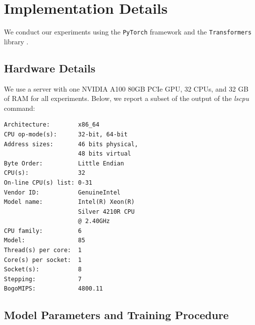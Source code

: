
\section{Implementation Details}\label{app:15-implementation_details}

We conduct our experiments using the \texttt{PyTorch} framework \citep{paszke-etal-2019-pytorch} and the \texttt{Transformers} library \citep{wolf-etal-2020-transformers}.

\subsection{Hardware Details}

We use a server with one NVIDIA A100 80GB PCIe GPU, 32 CPUs, and 32 GB of RAM for all experiments. Below, we report a subset of the output of the \emph{lscpu} command:

\begin{tcolorbox}[left=5pt,right=5pt,top=5pt,bottom=5pt]
\small
\begin{verbatim}
Architecture:        x86_64
CPU op-mode(s):      32-bit, 64-bit
Address sizes:       46 bits physical, 
                     48 bits virtual
Byte Order:          Little Endian
CPU(s):              32
On-line CPU(s) list: 0-31
Vendor ID:           GenuineIntel
Model name:          Intel(R) Xeon(R)
                     Silver 4210R CPU
                     @ 2.40GHz
CPU family:          6
Model:               85
Thread(s) per core:  1
Core(s) per socket:  1
Socket(s):           8
Stepping:            7
BogoMIPS:            4800.11
\end{verbatim}
\end{tcolorbox}

\subsection{Model Parameters and Training Procedure}

